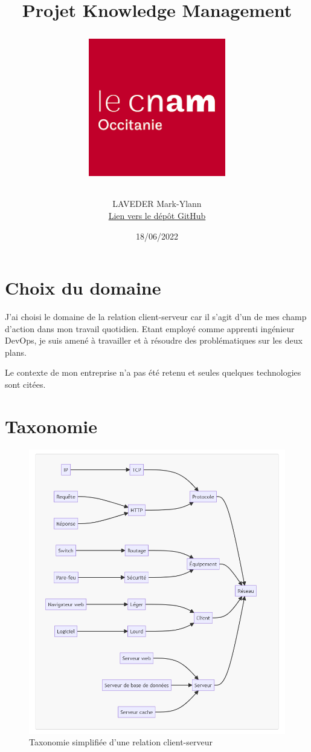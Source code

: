 \documentclass[a4paper,12pt,titlepage]{article}
\title{Projet Knowledge Management \\ \begin{center}
    \includegraphics[width=6cm]{../images/logo.png}
\end{center}}
\author{LAVEDER Mark-Ylann \\ \href{https://github.com/LavederMark-Ylann/SEC201}{Lien vers le dépôt GitHub}}
\date{18/06/2022}
\begin{document}
\maketitle
\thispagestyle{empty}
\clearpage

\renewcommand{\contentsname}{Sommaire}
\tableofcontents
\thispagestyle{empty}
\clearpage

\listoffigures
\thispagestyle{empty}
\clearpage


\setcounter{page}{1}
\section{Choix du domaine}
J'ai choisi le domaine de la relation client-serveur car il s'agit d'un de mes champ d'action dans mon travail quotidien.
Etant employé comme apprenti ingénieur DevOps, je suis amené à travailler et à résoudre des problématiques sur les deux plans.

\noindent
Le contexte de mon entreprise n'a pas été retenu et seules quelques technologies sont citées.

\section{Taxonomie}
\begin{figure}[H]
    \centering
    \includegraphics[width=\textwidth, height=\dimexpr\textheight-10cm\relax, keepaspectratio]{../images/mermaid_v1.png}
    \caption{Taxonomie simplifiée d'une relation client-serveur}\label{fig:Schéma de la taxonomie}
\end{figure}
\end{document}
